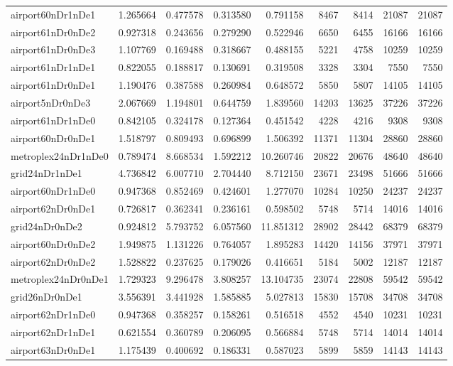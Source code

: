\begin{longtable}{|l|r|r|r|r|r|r|r|r|}
airport60nDr1nDe1 & 1.265664 & 0.477578 & 0.313580 & 0.791158 & 8467 & 8414 & 21087 & 21087 \\
airport61nDr0nDe2 & 0.927318 & 0.243656 & 0.279290 & 0.522946 & 6650 & 6455 & 16166 & 16166 \\
airport61nDr0nDe3 & 1.107769 & 0.169488 & 0.318667 & 0.488155 & 5221 & 4758 & 10259 & 10259 \\
airport61nDr1nDe1 & 0.822055 & 0.188817 & 0.130691 & 0.319508 & 3328 & 3304 & 7550 & 7550 \\
airport61nDr0nDe1 & 1.190476 & 0.387588 & 0.260984 & 0.648572 & 5850 & 5807 & 14105 & 14105 \\
airport5nDr0nDe3 & 2.067669 & 1.194801 & 0.644759 & 1.839560 & 14203 & 13625 & 37226 & 37226 \\
airport61nDr1nDe0 & 0.842105 & 0.324178 & 0.127364 & 0.451542 & 4228 & 4216 & 9308 & 9308 \\
airport60nDr0nDe1 & 1.518797 & 0.809493 & 0.696899 & 1.506392 & 11371 & 11304 & 28860 & 28860 \\
metroplex24nDr1nDe0 & 0.789474 & 8.668534 & 1.592212 & 10.260746 & 20822 & 20676 & 48640 & 48640 \\
grid24nDr1nDe1 & 4.736842 & 6.007710 & 2.704440 & 8.712150 & 23671 & 23498 & 51666 & 51666 \\
airport60nDr1nDe0 & 0.947368 & 0.852469 & 0.424601 & 1.277070 & 10284 & 10250 & 24237 & 24237 \\
airport62nDr0nDe1 & 0.726817 & 0.362341 & 0.236161 & 0.598502 & 5748 & 5714 & 14016 & 14016 \\
grid24nDr0nDe2 & 0.924812 & 5.793752 & 6.057560 & 11.851312 & 28902 & 28442 & 68379 & 68379 \\
airport60nDr0nDe2 & 1.949875 & 1.131226 & 0.764057 & 1.895283 & 14420 & 14156 & 37971 & 37971 \\
airport62nDr0nDe2 & 1.528822 & 0.237625 & 0.179026 & 0.416651 & 5184 & 5002 & 12187 & 12187 \\
metroplex24nDr0nDe1 & 1.729323 & 9.296478 & 3.808257 & 13.104735 & 23074 & 22808 & 59542 & 59542 \\
grid26nDr0nDe1 & 3.556391 & 3.441928 & 1.585885 & 5.027813 & 15830 & 15708 & 34708 & 34708 \\
airport62nDr1nDe0 & 0.947368 & 0.358257 & 0.158261 & 0.516518 & 4552 & 4540 & 10231 & 10231 \\
airport62nDr1nDe1 & 0.621554 & 0.360789 & 0.206095 & 0.566884 & 5748 & 5714 & 14014 & 14014 \\
airport63nDr0nDe1 & 1.175439 & 0.400692 & 0.186331 & 0.587023 & 5899 & 5859 & 14143 & 14143 \\

\end{longtable}
